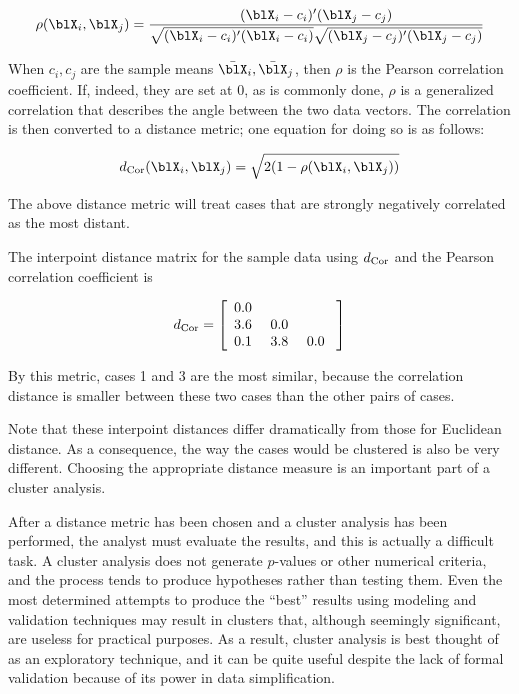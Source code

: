 \begin{eqnarray}
\rho(\blX_i,\blX_j) = \frac{(\blX_i-c_i)'(\blX_j-c_j)}
{\sqrt{(\blX_i-c_i)'(\blX_i-c_i)} \sqrt{(\blX_j-c_j)'(\blX_j-c_j)}}
\label{corc}
\end{eqnarray}

\noindent When $c_i, c_j$ are the sample means
$\bar{\blX}_i,\bar{\blX}_j$, then $\rho$ is the Pearson correlation
coefficient. If, indeed, they are set at 0, as is commonly done,
$\rho$ is a generalized correlation that describes the angle between
the two data vectors. The correlation is then converted to a distance
metric; one equation for doing so is as follows:

\begin{eqnarray*}
d_{\rm Cor}(\blX_i,\blX_j) = \sqrt{2(1-\rho(\blX_i,\blX_j))}
\end{eqnarray*}

\noindent %
The
above distance metric will treat cases that are strongly negatively
correlated as the most distant.

The interpoint distance matrix for the sample data using $d_{\rm Cor}$ and
the Pearson correlation coefficient is

\begin{eqnarray*}
d_{\rm Cor} = 
\left[ \begin{array}{rrrrrrrrr}
 0.0  ~&     &  \\
 3.6 ~ & 0.0 ~ &  \\
 0.1 ~ & 3.8 ~ &  0.0 ~\\
\end{array} \right]
\end{eqnarray*}

\noindent By this metric, cases 1 and 3 are the most similar, because 
the correlation distance is smaller between these two cases than the
other pairs of cases. 


Note that these interpoint distances differ dramatically from those
for Euclidean distance.  As a consequence, the way the cases would be
clustered is also be very different. Choosing the appropriate distance
measure is an important part of a cluster analysis.

After a distance metric has been chosen and a cluster analysis has
been performed, the analyst must evaluate the results, and this is
actually a difficult task.  A cluster analysis does not generate
$p$-values or other numerical criteria, and the process tends to
produce hypotheses rather than testing them.  Even the most determined
attempts to produce the ``best'' results using modeling and validation
techniques may result in clusters that, although seemingly significant,
are useless for practical purposes.  As a result, cluster analysis is
best thought of as an exploratory technique, and it can be
quite useful despite the lack of formal validation because of its
power in data simplification.

